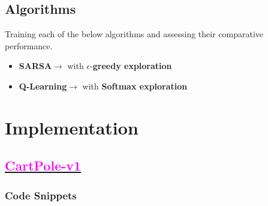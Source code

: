\documentclass[11pt, a4]{article}
\begin{document}
		\subsection{Algorithms}
		Training each of the below algorithms and assessing their comparative performance.
		\begin{itemize}
			\item \textbf{SARSA}$\rightarrow$ with $\epsilon$-\textbf{greedy exploration}
			\item \textbf{Q-Learning}$\rightarrow$ with \textbf{Softmax exploration}
		\end{itemize}
	\section{Implementation}
		\subsection{\href{https://github.com/RitabrataMandal/RL-DA6400-assignment_1/tree/main/cartpole-v1}{\textcolor{magenta}{CartPole-v1}}}
			\subsubsection{Code Snippets}
				
				
				
				
				
				
%				
\end{document}
